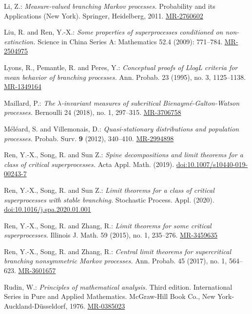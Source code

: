 \documentclass[12pt,a4paper]{amsart}
\numberwithin{equation}{section}
\theoremstyle{plain}
\theoremstyle{definition}
\theoremstyle{remark}
\def\MR#1{\href{http://www.ams.org/mathscinet-getitem?mr=#1}{MR-#1}}
\def\DOI#1{\href{https://doi.org/#1}{doi:#1}}
\begin{document}
\begin{thebibliography}{99}
	Li, Z.:
	\emph{Measure-valued branching Markov processes.}
	Probability and its Applications (New York). Springer, Heidelberg, 2011.
	\MR{2760602}
	
	Liu, R. and Ren, Y.-X.:
	\emph{Some properties of superprocesses conditioned on non-extinction.}
	Science in China Series A: Mathematics 52.4 (2009): 771--784.
	\MR{2504975}
	
	Lyons, R., Pemantle, R. and Peres, Y.:
	\emph{Conceptual proofs of LlogL criteria for mean behavior of branching processes.}
	Ann. Probab. 23 (1995), no. 3, 1125--1138.
	\MR{1349164}
	
	Maillard, P.:
	\emph{The $\lambda$-invariant measures of subcritical Bienaym\'e-Galton-Watson processes.}
	Bernoulli 24 (2018), no. 1, 297--315.
	\MR{3706758}

	M\'el\'eard, S. and Villemonais, D.:
	\emph{Quasi-stationary distributions and population processes.}
	Probab. Surv. \textbf{9} (2012),
	340--410.
	\MR{2994898}
	
	
	Ren, Y.-X., Song, R. and Sun Z.:
	\emph{Spine decompositions and limit theorems for a class of critical superprocesses.}
	Acta Appl. Math. (2019). 
	\DOI{10.1007/s10440-019-00243-7}
	
	Ren, Y.-X., Song, R. and Sun Z.:
	\emph{Limit theorems for a class of critical superprocesses with stable branching.}
	Stochastic Process. Appl. (2020). 
	\DOI{10.1016/j.spa.2020.01.001}	

	Ren, Y.-X., Song, R. and Zhang, R.:
	\emph{Limit theorems for some critical superprocesses.}
	Illinois J. Math. 59 (2015), no. 1, 235--276.
	\MR{3459635}

	Ren, Y.-X., Song, R. and Zhang, R.:
	\emph{Central limit theorems for supercritical branching nonsymmetric Markov processes.}
	Ann. Probab. 45 (2017), no. 1, 564--623.
	\MR{3601657}
	
	Rudin, W.:
	\emph{Principles of mathematical analysis.}
	Third edition. International Series in Pure and Applied Mathematics. McGraw-Hill Book Co., New York-Auckland-D\"usseldorf, 1976.
	\MR{0385023}


\end{thebibliography}
\end{document}
